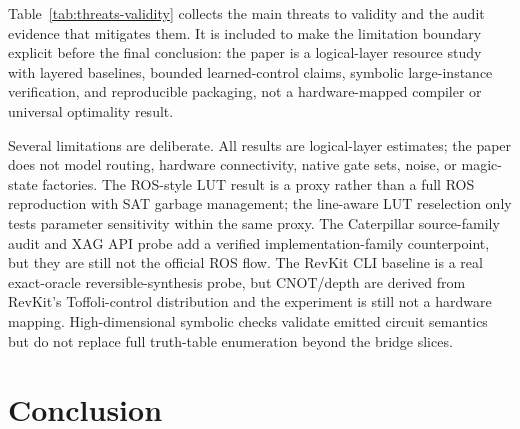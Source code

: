 \documentclass[11pt]{article}
\begin{document}
Table~\ref{tab:threats-validity} collects the main threats to validity and the
audit evidence that mitigates them.  It is included to make the limitation
boundary explicit before the final conclusion: the paper is a logical-layer
resource study with layered baselines, bounded learned-control claims,
symbolic large-instance verification, and reproducible packaging, not a
hardware-mapped compiler or universal optimality result.

\begin{table}[H]
\centering
\scriptsize
\setlength{\tabcolsep}{2pt}
\renewcommand{\arraystretch}{1.05}
\caption{Threats-to-validity and mitigation audit.  Each row names a reviewer
risk, points to the generated evidence that mitigates it, and preserves the
residual boundary that the current experiments do not cross.}
\label{tab:threats-validity}

\end{table}

Several limitations are deliberate.  All results are logical-layer estimates;
the paper does not model routing, hardware connectivity, native gate sets,
noise, or magic-state factories.  The ROS-style LUT result is a proxy rather
than a full ROS reproduction with SAT garbage management; the line-aware LUT
reselection only tests parameter sensitivity within the same proxy.  The
Caterpillar source-family audit and XAG API probe add a verified
implementation-family counterpoint, but they are still not the official ROS
flow.  The RevKit CLI baseline is a real exact-oracle reversible-synthesis
probe, but CNOT/depth are derived from RevKit's Toffoli-control distribution
and the experiment is still not a hardware mapping.  High-dimensional symbolic checks validate
emitted circuit semantics but do not replace full truth-table enumeration
beyond the bridge slices.

\section{Conclusion}
\end{document}
